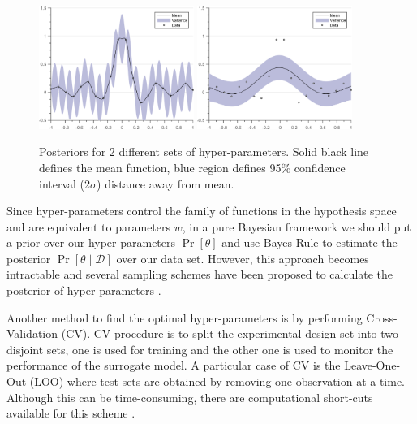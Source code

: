   \begin{figure}[!ht]
  \centering
    \subfigure[{Posterior between SE prior with hyper-parameters $(\theta = [0.35, 0.05]; \sigma_{noise} = 0.01)$ and data. }]
  {
        \includegraphics[width=0.45\textwidth]
        {images/part1/posteriorSE1}
        \label{subFigPosterior1}
  }\quad
\subfigure[{Posterior between SE prior with hyper-parameters $(\theta = [0.35, 0.5]; \sigma_{noise} = 0.01)$ and data. }]
  {
        \includegraphics[width=0.45\textwidth]
        {images/part1/posteriorSE3}
        \label{subFigPosterior3}
  }\quad
       \caption{Posteriors for 2 different sets of hyper-parameters. Solid black line defines the mean function, blue region defines 95\% confidence interval (2$\sigma$) distance away from mean. }\label{figGPRMarginal}
\end{figure}

Since hyper-parameters control the family of functions in the hypothesis space and are equivalent to parameters $w$, in a pure Bayesian framework we should put a prior over our hyper-parameters $\Pr[\theta]$ and use Bayes Rule to estimate the posterior $\Pr[\theta \mid \mathcal{D}]$ over our data set. However, this approach becomes intractable and several sampling schemes have been proposed to calculate the posterior of hyper-parameters \cite{osborne2010bayesian, neal2011mcmc}.

Another method to find the optimal hyper-parameters is by performing Cross-Validation (CV). CV procedure is to split the experimental design set into two disjoint sets, one is used for training and the other one is used to monitor the performance
of the surrogate model. A particular case of CV is the Leave-One-Out (LOO) where test sets are obtained by removing one observation at-a-time. Although this can be time-consuming, there are computational short-cuts available for this scheme \cite{rasmussen2006gaussian, dubrule1983cross, le2013multi}. 

